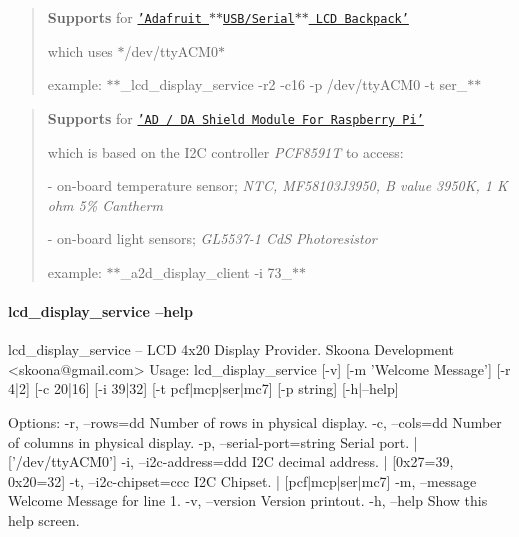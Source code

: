 \begin{quote}
{\bfseries Supports} for \href{https://www.adafruit.com/products/782}{\tt 'Adafruit $\ast$$\ast$\+U\+S\+B/\+Serial$\ast$$\ast$ L\+C\+D Backpack'}
\begin{DoxyItemize}
\item which uses $\ast$/dev/tty\+A\+C\+M0$\ast$
\item example\+: $\ast$$\ast$\+\_\+lcd\+\_\+display\+\_\+service -\/r2 -\/c16 -\/p /dev/tty\+A\+C\+M0 -\/t ser\+\_\+$\ast$$\ast$ 
\end{DoxyItemize}\end{quote}


\begin{quote}
{\bfseries Supports} for \href{http://www.amazon.com/Shield-Module-For-Raspberry-Arduino/dp/B00WGW48A8}{\tt 'A\+D / D\+A Shield Module For Raspberry Pi'}
\begin{DoxyItemize}
\item which is based on the I2\+C controller {\itshape P\+C\+F8591\+T} to access\+:
\item -\/ on-\/board temperature sensor; {\itshape N\+T\+C, M\+F58103\+J3950, B value 3950\+K, 1 K ohm 5\% Cantherm}
\item -\/ on-\/board light sensors; {\itshape G\+L5537-\/1 Cd\+S Photoresistor}
\item example\+: $\ast$$\ast$\+\_\+a2d\+\_\+display\+\_\+client -\/i 73\+\_\+$\ast$$\ast$ 
\end{DoxyItemize}\end{quote}


\paragraph*{lcd\+\_\+display\+\_\+service --help}

\begin{DoxyVerb}lcd_display_service -- LCD 4x20 Display Provider.
          Skoona Development <skoona@gmail.com>
Usage:
  lcd_display_service [-v] [-m 'Welcome Message'] [-r 4|2] [-c 20|16] [-i 39|32] [-t pcf|mcp|ser|mc7] [-p string] [-h|--help]

Options:
  -r, --rows=dd  Number of rows in physical display.
  -c, --cols=dd  Number of columns in physical display.
  -p, --serial-port=string Serial port.       | ['/dev/ttyACM0']
  -i, --i2c-address=ddd  I2C decimal address. | [0x27=39, 0x20=32]
  -t, --i2c-chipset=ccc  I2C Chipset.         | [pcf|mcp|ser|mc7]
  -m, --message  Welcome Message for line 1.
  -v, --version  Version printout.
  -h, --help     Show this help screen.
\end{DoxyVerb}


